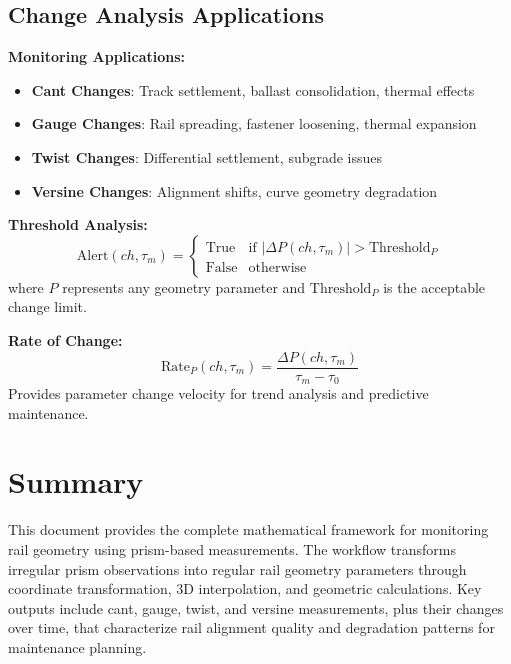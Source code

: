 \documentclass{article}
\begin{document}
\subsection{Change Analysis Applications}
\textbf{Monitoring Applications:}
\begin{itemize}
\item \textbf{Cant Changes}: Track settlement, ballast consolidation, thermal effects
\item \textbf{Gauge Changes}: Rail spreading, fastener loosening, thermal expansion
\item \textbf{Twist Changes}: Differential settlement, subgrade issues
\item \textbf{Versine Changes}: Alignment shifts, curve geometry degradation
\end{itemize}

\textbf{Threshold Analysis:}
\begin{equation}
\text{Alert}(ch, \tau_m) = \begin{cases}
\text{True} & \text{if } |\Delta P(ch, \tau_m)| > \text{Threshold}_P \\
\text{False} & \text{otherwise}
\end{cases}
\end{equation}
where $P$ represents any geometry parameter and $\text{Threshold}_P$ is the acceptable change limit.

\textbf{Rate of Change:}
\begin{equation}
\text{Rate}_P(ch, \tau_m) = \frac{\Delta P(ch, \tau_m)}{\tau_m - \tau_0}
\end{equation}
Provides parameter change velocity for trend analysis and predictive maintenance.

\section{Summary}
This document provides the complete mathematical framework for monitoring rail geometry using prism-based measurements. The workflow transforms irregular prism observations into regular rail geometry parameters through coordinate transformation, 3D interpolation, and geometric calculations. Key outputs include cant, gauge, twist, and versine measurements, plus their changes over time, that characterize rail alignment quality and degradation patterns for maintenance planning.
\end{document}
